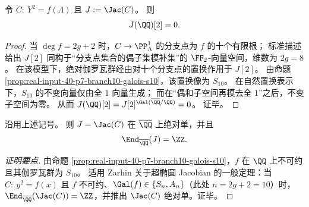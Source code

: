 \begin{proposition}\label{prop:real-input-40-p7-jacobian-2torsion}
令 \(C:\ Y^2=f(\Lambda)\) 且 \(J:=\Jac(C)\)。
则
\[
J(\QQ)[2]=0.
\]
\end{proposition}
\begin{proof}
当 \(\deg f=2g+2\) 时，\(C\to\PP^1_\Lambda\) 的分支点为 \(f\) 的十个有限根；
标准描述给出 \(J[2]\) 同构于“分支点集合的偶子集模补集”的 \(\FF_2\)-向量空间，维数为 \(2g=8\)。
在该模型下，绝对伽罗瓦群经由对十个分支点的置换作用于 \(J[2]\)。
由命题 \ref{prop:real-input-40-p7-branch10-galois-s10}，该置换像为 \(S_{10}\)。
在自然置换表示下，\(S_{10}\) 的不变向量仅由全 \(1\) 向量生成；
而在“偶和子空间再模去全 \(1\)”之后，不变子空间为零。
从而
\(
J(\QQ)[2]=J[2]^{\Gal(\overline{\QQ}/\QQ)}=0
\)。
证毕。
\end{proof}

\begin{corollary}[绝对单性与端同态环]\label{cor:real-input-40-p7-jacobian-endoZ}
沿用上述记号。
则 \(J=\Jac(C)\) 在 \(\overline{\QQ}\) 上绝对单，并且
\[
\End_{\overline{\QQ}}(J)=\ZZ.
\]
\end{corollary}
\begin{proof}[证明要点]
由命题 \ref{prop:real-input-40-p7-branch10-galois-s10}，\(f\) 在 \(\QQ\) 上不可约且其伽罗瓦群为 \(S_{10}\)。
适用 Zarhin 关于超椭圆 Jacobian 的一般定理：当 \(C:\ y^2=f(x)\) 且 \(f\) 不可约、\(\Gal(f)\in\{S_n,A_n\}\)（此处 \(n=2g+2=10\)）时，
\(\End_{\overline{\QQ}}(\Jac(C))=\ZZ\)，并推出 \(\Jac(C)\) 绝对单。证毕。
\end{proof}

